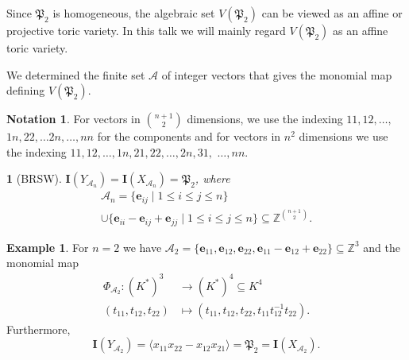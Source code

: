 \documentclass[mathserif
    , handout
   ]{beamer}
\newcommand{\pr}{\mathfrak P}
\newcommand{\vect}[1]{\mathbf#1}
\newcommand{\Z}{\mathbb Z}
\theoremstyle{plain}
\newtheorem{prop}[thm]{\color{white}{Proposition}}
\theoremstyle{definition}
\newtheorem{ex}[thm]{Example}
\newtheorem{ntn}[thm]{Notation}
\theoremstyle{remark}
\begin{document}
\begin{frame}
Since $\pr_2$ is homogeneous, the algebraic set $V(\pr_2)$ can be viewed as an affine or projective toric variety.  In this talk we will mainly regard $V(\pr_2)$ as an affine toric variety.  

\pause
\vspace{0.75pc}
We determined the finite set $\mathscr A$ of integer vectors that gives the monomial map defining $V(\pr_2)$. 
\end{frame}

\begin{frame}
\begin{ntn}
For vectors in $\binom{n+1}{2}$ dimensions, we use the indexing $11,12,\dots,$ $1n,22,\dots 2n,\dots,nn$ for the components and for vectors in $n^2$ dimensions we use the indexing $11,12,\dots,1n,21,22,\dots,2n,31,$ $\dots,nn$.
\end{ntn}

\pause
\begin{prop}[BRSW]
\label{prop:A_n}
$\vect I(Y_{\mathscr A_n})=\vect I(X_{\mathscr A_n})=\pr_2$, where 
\begin{multline*}
\mathscr A_n = \{\vect e_{ij}\mid 1\leq i\leq j\leq n\} \\
\cup \{\vect e_{ii}-\vect e_{ij}+\vect e_{jj}\mid 1\leq i\leq j\leq n\}\subseteq \Z^{\binom{n+1}{2}}.
\end{multline*}
\end{prop}
\end{frame}

\begin{frame}
\begin{ex}
For $n=2$ we have 
$\mathscr A_2 = \{\vect e_{11},\vect e_{12},\vect e_{22},\vect e_{11}-\vect e_{12}+\vect e_{22}\}\subseteq\Z^3
$ %
and the monomial map
\begin{align*}
\Phi_{\mathscr A_2}: (K^*)^3 &\to (K^*)^4\subseteq K^4 \\
(t_{11},t_{12},t_{22}) &\mapsto (t_{11},t_{12},t_{22},t_{11}t_{12}^{-1}t_{22}).
\end{align*} Furthermore, 
\[
\vect I(Y_{\mathscr A_2})= \langle x_{11}x_{22}-x_{12}x_{21}\rangle=\pr_2=\vect I(X_{\mathscr A_2}).
\]
\end{ex}
\end{frame}

\end{document}
